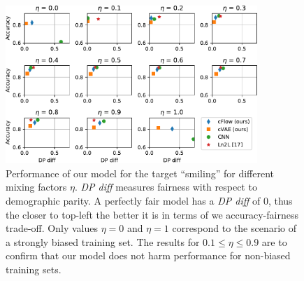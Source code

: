 \begin{figure}[tb]
    \centering
    \includegraphics[width=0.85\textwidth]{./Figures/nosinn_celeba_multiplot_all_landscape_Smiling.pdf}
    \caption{
        Performance of our model for the target ``smiling'' for different mixing factors $\eta$.
        \emph{DP diff} measures fairness with respect to demographic parity.
        A perfectly fair model has a \emph{DP diff} of 0, thus the closer to top-left the better it is in terms of we accuracy-fairness trade-off.
        Only values $\eta=0$ and $\eta=1$ correspond to the scenario of a strongly biased training set.
        The results for $0.1\leq \eta\leq 0.9$ are to confirm that our model does not harm performance for non-biased training sets.
    }%
    \label{fig:celeba-multiplot}
\end{figure}

